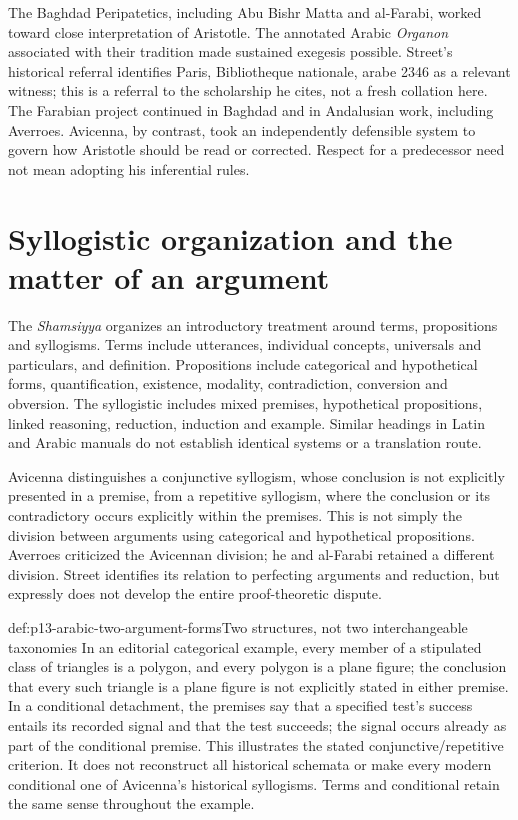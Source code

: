 The Baghdad Peripatetics, including Abu Bishr Matta and al-Farabi,
worked toward close interpretation of Aristotle. The annotated Arabic
\emph{Organon} associated with their tradition made sustained exegesis
possible. Street's historical referral identifies Paris, Bibliotheque
nationale, arabe 2346 as a relevant witness; this is a referral to the
scholarship he cites, not a fresh collation here. The Farabian project
continued in Baghdad and in Andalusian work, including Averroes.
Avicenna, by contrast, took an independently defensible system to
govern how Aristotle should be read or corrected. Respect for a
predecessor need not mean adopting his inferential rules.
\cite[pp.~251, 263--264, notes~13--14 and 27--32]{Street2005LogicSupplement}

\section{Syllogistic organization and the matter of an argument}
\label{sec:p13-arabic-syllogistic-organization}

The \emph{Shamsiyya} organizes an introductory treatment around terms,
propositions and syllogisms. Terms include utterances, individual
concepts, universals and particulars, and definition. Propositions
include categorical and hypothetical forms, quantification, existence,
modality, contradiction, conversion and obversion. The syllogistic
includes mixed premises, hypothetical propositions, linked reasoning,
reduction, induction and example. Similar headings in Latin and
Arabic manuals do not establish identical systems or a translation route.
\cite[pp.~254--256]{Street2005LogicSupplement}

Avicenna distinguishes a conjunctive syllogism, whose conclusion
is not explicitly presented in a premise, from a repetitive syllogism,
where the conclusion or its contradictory occurs explicitly within
the premises. This is not simply the division between arguments
using categorical and hypothetical propositions. Averroes criticized
the Avicennan division; he and al-Farabi retained a different division.
Street identifies its relation to perfecting arguments and reduction,
but expressly does not develop the entire proof-theoretic dispute.
\cite[pp.~255, 264, notes~23--24]{Street2005LogicSupplement}

\begin{hbexample}{def:p13-arabic-two-argument-forms}{Two structures, not two interchangeable taxonomies}
In an editorial categorical example, every member of a stipulated
class of triangles is a polygon, and every polygon is a plane figure;
the conclusion that every such triangle is a plane figure is not
explicitly stated in either premise. In a conditional detachment,
the premises say that a specified test's success entails its recorded
signal and that the test succeeds; the signal occurs already as part
of the conditional premise. This illustrates the stated
conjunctive/repetitive criterion. It does not reconstruct all historical
schemata or make every modern conditional one of Avicenna's
historical syllogisms. Terms and conditional retain the same sense
throughout the example.
\end{hbexample}

